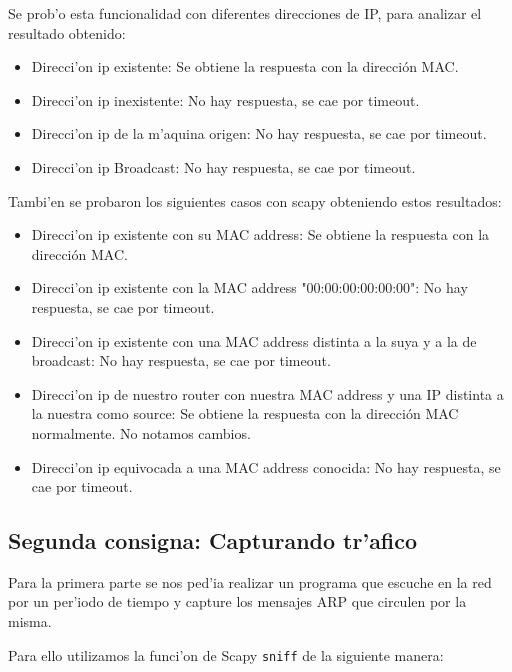 \documentclass[a4paper,10pt]{article}
\begin{document}
\vspace*{5 mm}
Se prob'o esta funcionalidad con diferentes direcciones de IP, para analizar el resultado obtenido:

\begin{itemize}
	\item Direcci'on ip existente: Se obtiene la respuesta con la dirección MAC.
	\item Direcci'on ip inexistente: No hay respuesta, se cae por timeout.
	\item Direcci'on ip de la m'aquina origen: No hay respuesta, se cae por timeout.
	\item Direcci'on ip Broadcast: No hay respuesta, se cae por timeout.
\end{itemize}

Tambi'en se probaron los siguientes casos con scapy obteniendo estos resultados:

\begin{itemize}
	\item Direcci'on ip existente con su MAC address: Se obtiene la respuesta con la dirección MAC.
	\item Direcci'on ip existente con la MAC address "00:00:00:00:00:00": No hay respuesta, se cae por timeout.
	\item Direcci'on ip existente con una MAC address distinta a la suya y a la de broadcast: No hay respuesta, se cae por timeout.
	\item Direcci'on ip de nuestro router con nuestra MAC address y una IP distinta a la nuestra como source: Se obtiene la respuesta con la dirección MAC normalmente. No notamos cambios.
	\item Direcci'on ip equivocada a una MAC address conocida: No hay respuesta, se cae por timeout.
\end{itemize}

\subsection{Segunda consigna: Capturando tr'afico}
\label{expli1:}

Para la primera parte se nos ped'ia realizar un programa que escuche en la red por un per'iodo de tiempo y capture los mensajes ARP que circulen por la misma.

\vspace*{5 mm}

Para ello utilizamos la funci'on de Scapy \texttt{sniff} de la siguiente manera:

\vspace*{5 mm}
\end{document}

